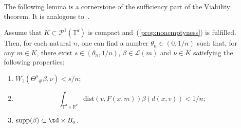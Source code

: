 \documentclass[12pt]{article}
\newcommand{\ptd}{\mathcal{P}^1(\mathbb{T}^d)}
\newcommand{\inttrd}{\int_{\mathbb{T}^d\times \mathbb{R}^d}}
\begin{document}
The following lemma is a cornerstone of the sufficiency part of the Viability theorem. It is analogous to~\cite[Lemma 3.4.3]{Aubin}.
\begin{lemma}\label{lm:one_step} Assume that $K\subset\ptd$ is compact and~(\ref{prop:nonemptyness}) is fulfilled. Then, for each  natural $n$, one can find a number $\theta_n\in (0,1/n)$ such that, for any $m\in K$, there exist $s\in (\theta_n,1/n)$, $\beta\in\mathcal{L}(m)$ and $\nu\in K$ satisfying the following properties:
	\begin{enumerate}
		\item $W_1(\Theta^s{}_\#\beta,\nu)<s/n$;
		\item $$\inttrd\mathrm{dist}(v,F(x,m))\beta(d(x,v))<1/n; $$
		\item $\mathrm{supp}(\beta)\subset \td\times B_a$.
	\end{enumerate}
\end{lemma}
\end{document}
